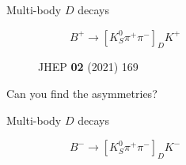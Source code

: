 \documentclass[dvipsnames]{beamer}
\begin{document}
\begin{frame}{Multi-body $D$ decays}
\begin{figure}
\begin{subfigure}{0.5\textwidth}
\begin{tikzpicture}
      \end{tikzpicture}
      \vspace{-0.8cm}
      \caption*{$B^+\to[K_S^0\pi^+\pi^-]_DK^+$}
    \end{subfigure}
    \vspace{-0.3cm}
    \caption*{\tiny JHEP \textbf{02} (2021) 169}
  \end{figure}
  \vspace{-0.6cm}
  \begin{center}
    \Large Can you find the asymmetries?
  \end{center}
\end{frame}

\begin{frame}{Multi-body $D$ decays}
  \begin{figure}
    \begin{subfigure}{0.5\textwidth}
      \vspace{-0.8cm}
      \caption*{$B^-\to[K_S^0\pi^+\pi^-]_DK^-$}
    \end{subfigure}%
    \begin{subfigure}{0.5\textwidth}

\end{subfigure}
\end{figure}
\end{frame}
\end{document}
